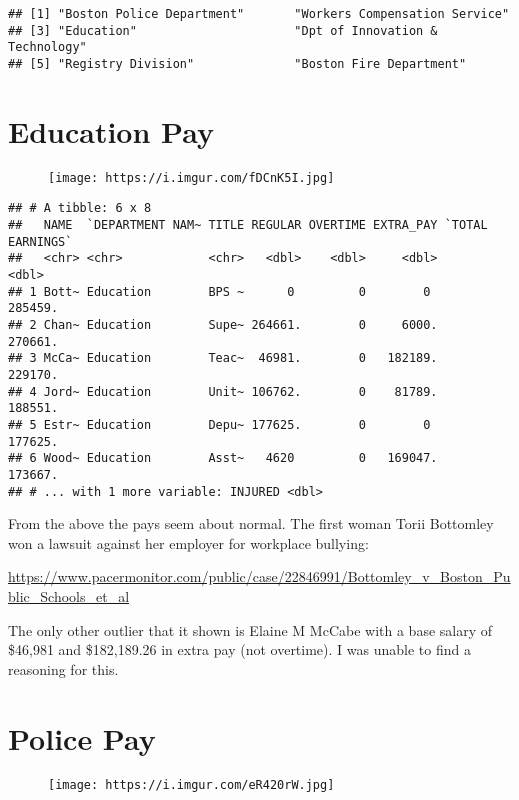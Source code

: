 \documentclass[]{article}
\begin{document}
\begin{verbatim}
## [1] "Boston Police Department"       "Workers Compensation Service"  
## [3] "Education"                      "Dpt of Innovation & Technology"
## [5] "Registry Division"              "Boston Fire Department"
\end{verbatim}

\newpage

\section{Education Pay}\label{education-pay}

\begin{figure}
\centering
\texttt{[image: https://i.imgur.com/fDCnK5I.jpg]}
\caption{}
\end{figure}

\begin{verbatim}
## # A tibble: 6 x 8
##   NAME  `DEPARTMENT NAM~ TITLE REGULAR OVERTIME EXTRA_PAY `TOTAL EARNINGS`
##   <chr> <chr>            <chr>   <dbl>    <dbl>     <dbl>            <dbl>
## 1 Bott~ Education        BPS ~      0         0        0           285459.
## 2 Chan~ Education        Supe~ 264661.        0     6000.          270661.
## 3 McCa~ Education        Teac~  46981.        0   182189.          229170.
## 4 Jord~ Education        Unit~ 106762.        0    81789.          188551.
## 5 Estr~ Education        Depu~ 177625.        0        0           177625.
## 6 Wood~ Education        Asst~   4620         0   169047.          173667.
## # ... with 1 more variable: INJURED <dbl>
\end{verbatim}

From the above the pays seem about normal. The first woman Torii
Bottomley won a lawsuit against her employer for workplace bullying:

\url{https://www.pacermonitor.com/public/case/22846991/Bottomley_v_Boston_Public_Schools_et_al}

The only other outlier that it shown is Elaine M McCabe with a base
salary of \$46,981 and \$182,189.26 in extra pay (not overtime). I was
unable to find a reasoning for this.

\newpage

\section{Police Pay}\label{police-pay}

\begin{figure}
\centering
\texttt{[image: https://i.imgur.com/eR420rW.jpg]}
\caption{}
\end{figure}
\end{document}
